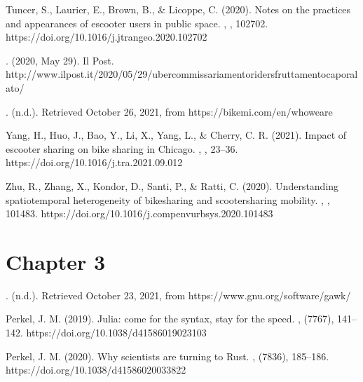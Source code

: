 \documentclass[letterpaper,10pt,english]{jupyterBook}
\begin{document}
\sphinxAtStartPar
Tuncer, S., Laurier, E., Brown, B., \& Licoppe, C. (2020). Notes on the practices and appearances of e\sphinxhyphen{}scooter users in public space. , , 102702. https://doi.org/10.1016/j.jtrangeo.2020.102702

\sphinxAtStartPar
{}. (2020, May 29). Il Post. http://www.ilpost.it/2020/05/29/uber\sphinxhyphen{}commissariamento\sphinxhyphen{}rider\sphinxhyphen{}sfruttamento\sphinxhyphen{}caporalato/

\sphinxAtStartPar
{}. (n.d.). Retrieved October 26, 2021, from https://bikemi.com/en/who\sphinxhyphen{}we\sphinxhyphen{}are

\sphinxAtStartPar
Yang, H., Huo, J., Bao, Y., Li, X., Yang, L., \& Cherry, C. R. (2021). Impact of e\sphinxhyphen{}scooter sharing on bike sharing in Chicago. , , 23–36. https://doi.org/10.1016/j.tra.2021.09.012

\sphinxAtStartPar
Zhu, R., Zhang, X., Kondor, D., Santi, P., \& Ratti, C. (2020). Understanding spatio\sphinxhyphen{}temporal heterogeneity of bike\sphinxhyphen{}sharing and scooter\sphinxhyphen{}sharing mobility. , , 101483. https://doi.org/10.1016/j.compenvurbsys.2020.101483


\section{Chapter 3}
\label{\detokenize{references:chapter-3}}
\sphinxAtStartPar
{}. (n.d.). Retrieved October 23, 2021, from https://www.gnu.org/software/gawk/

\sphinxAtStartPar
Perkel, J. M. (2019). Julia: come for the syntax, stay for the speed. , (7767), 141–142. https://doi.org/10.1038/d41586\sphinxhyphen{}019\sphinxhyphen{}02310\sphinxhyphen{}3

\sphinxAtStartPar
Perkel, J. M. (2020). Why scientists are turning to Rust. , (7836), 185–186. https://doi.org/10.1038/d41586\sphinxhyphen{}020\sphinxhyphen{}03382\sphinxhyphen{}2
\end{document}
